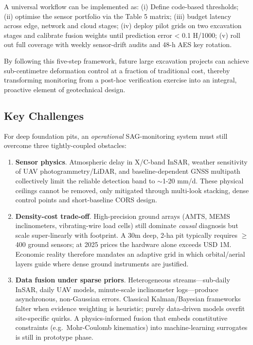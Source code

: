 \documentclass[preprint,11pt,authoryear,3p]{elsarticle}
\begin{document}
A universal workflow can be implemented as: (i) Define code-based thresholds; (ii) optimise the sensor portfolio via the Table 5 matrix; (iii) budget latency across edge, network and cloud stages; (iv) deploy pilot grids on two excavation stages and calibrate fusion weights until prediction error < 0.1 H/1000; (v) roll out full coverage with weekly sensor-drift audits and 48-h AES key rotation.

By following this five-step framework, future large excavation projects can achieve sub-centimetre deformation control at a fraction of traditional cost, thereby transforming monitoring from a post-hoc verification exercise into an integral, proactive element of geotechnical design.

\subsection{Key Challenges}\label{sec:challenges}

For deep foundation pits, an \emph{operational} SAG-monitoring system must still overcome three tightly-coupled obstacles:

\begin{enumerate}
  \item \textbf{Sensor physics}. Atmospheric delay in X/C-band InSAR, weather sensitivity of UAV photogrammetry/LiDAR, and baseline-dependent GNSS multipath collectively limit the reliable detection band to $\sim$1-20 mm/d.  These physical ceilings cannot be removed, only mitigated through multi-look stacking, dense control points and short-baseline CORS design.

  \item \textbf{Density-cost trade-off}. High-precision ground arrays (AMTS, MEMS inclinometers, vibrating-wire load cells) still dominate \emph{causal} diagnosis but scale super-linearly with footprint. A 30m deep, 2-ha pit typically requires $\geq$400 ground sensors; at 2025 prices the hardware alone exceeds USD 1M. Economic reality therefore mandates an adaptive grid in which orbital/aerial layers guide where dense ground instruments are justified.

  \item \textbf{Data fusion under sparse priors}. Heterogeneous streams—sub-daily InSAR, daily UAV models, minute-scale inclinometer logs—produce asynchronous, non-Gaussian errors. Classical Kalman/Bayesian frameworks falter when evidence weighting is heuristic; purely data-driven models overfit site-specific quirks.  A physics-informed fusion that embeds constitutive constraints (e.g.\ Mohr-Coulomb kinematics) into machine-learning surrogates is still in prototype phase.
\end{enumerate}
\end{document}
